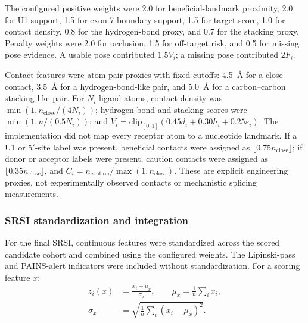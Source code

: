 \documentclass[journal]{IEEEtran}
\begin{document}
The configured positive weights were 2.0 for beneficial-landmark
proximity, 2.0 for U1 support, 1.5 for exon-7-boundary support, 1.5 for
target score, 1.0 for contact density, 0.8 for the hydrogen-bond proxy,
and 0.7 for the stacking proxy. Penalty weights were 2.0 for occlusion,
1.5 for off-target risk, and 0.5 for missing pose evidence. A usable
pose contributed $1.5V_i$; a missing pose contributed $2F_i$.

Contact features were atom-pair proxies with fixed cutoffs: 4.5~\AA{}
for a close contact, 3.5~\AA{} for a hydrogen-bond-like pair, and
5.0~\AA{} for a carbon--carbon stacking-like pair. For $N_i$ ligand
atoms, contact density was
$\min(1,n_{\mathrm{close}}/(4N_i))$; hydrogen-bond and stacking scores
were $\min(1,n/(0.5N_i))$; and
$V_i=\mathrm{clip}_{[0,1]}(0.45d_i+0.30h_i+0.25s_i)$. The implementation
did not map every receptor atom to a nucleotide landmark. If a U1 or
5$'$-site label was present, beneficial contacts were assigned as
$\lfloor0.75n_{\mathrm{close}}\rfloor$; if donor or acceptor labels were
present, caution contacts were assigned as
$\lfloor0.35n_{\mathrm{close}}\rfloor$, and
$C_i=n_{\mathrm{caution}}/\max(1,n_{\mathrm{close}})$. These are explicit
engineering proxies, not experimentally observed contacts or mechanistic
splicing measurements.

\subsubsection{SRSI standardization and integration}
For the final SRSI, continuous features were standardized across the
scored candidate cohort and combined using the configured weights. The
Lipinski-pass and PAINS-alert indicators were included without
standardization. For a scoring feature $x$:
\begin{equation*}
\begin{aligned}
z_{i}(x) &= \frac{x_{i} - \mu_{x}}{\sigma_{x}}, \qquad
\mu_{x} = \frac{1}{n}\sum_{i} x_{i},\\[4pt]
\sigma_{x} &= \sqrt{\frac{1}{n}\sum_{i}(x_{i} - \mu_{x})^{2}}.
\end{aligned}
\end{equation*}
\end{document}
